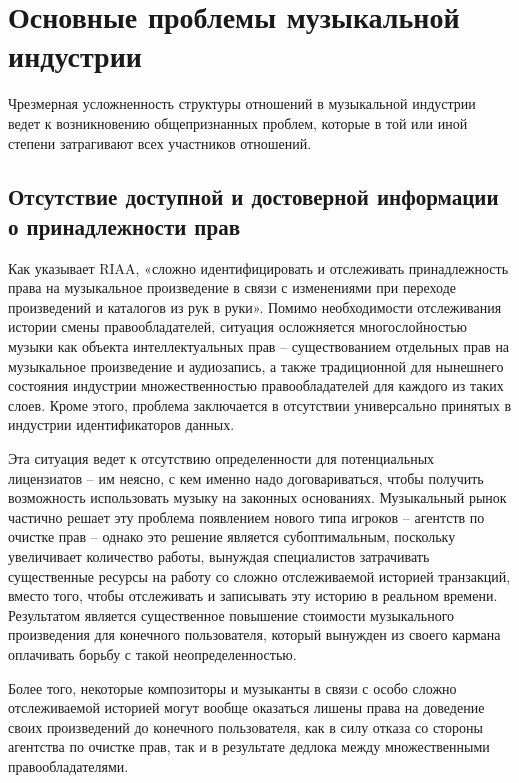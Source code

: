 \documentclass[12pt]{report}
\begin{document}
\section{Основные проблемы музыкальной индустрии}
\label{industry-problems}
\begin{multicols}{2}
Чрезмерная усложненность структуры отношений в музыкальной индустрии ведет к возникновению общепризнанных проблем, которые в той или иной степени затрагивают всех участников отношений.

\subsection{Отсутствие доступной и достоверной информации о принадлежности прав}

Как указывает RIAA, «сложно идентифицировать и отслеживать принадлежность права на музыкальное произведение в связи с изменениями при переходе произведений и каталогов из рук в руки». Помимо необходимости отслеживания истории смены правообладателей, ситуация осложняется многослойностью музыки как объекта интеллектуальных прав – существованием отдельных прав на музыкальное произведение и аудиозапись, а также традиционной для нынешнего состояния индустрии множественностью правообладателей для каждого из таких слоев. Кроме этого, проблема заключается в отсутствии универсально принятых в индустрии идентификаторов данных. 

Эта ситуация ведет к отсутствию определенности для потенциальных лицензиатов – им неясно, с кем именно надо договариваться, чтобы получить возможность использовать музыку на законных основаниях. Музыкальный рынок частично решает эту проблема появлением нового типа игроков – агентств по очистке прав – однако это решение является субоптимальным, поскольку увеличивает количество работы, вынуждая специалистов затрачивать существенные ресурсы на работу со сложно отслеживаемой историей транзакций, вместо того, чтобы отслеживать и записывать эту историю в реальном времени. Результатом является существенное повышение стоимости музыкального произведения для конечного пользователя, который вынужден из своего кармана оплачивать борьбу с такой неопределенностью. 

Более того, некоторые композиторы и музыканты в связи с особо сложно отслеживаемой историей могут вообще оказаться лишены права на доведение своих произведений до конечного пользователя, как в силу отказа со стороны агентства по очистке прав, так и в результате дедлока между множественными правообладателями.


\end{multicols}
\end{document}
